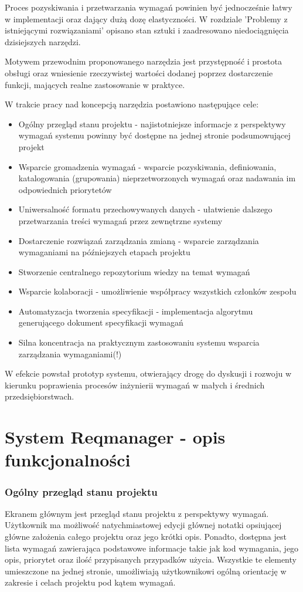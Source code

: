     Proces pozyskiwania i przetwarzania wymagań powinien być jednocześnie łatwy w implementacji oraz dający dużą dozę elastyczności. W rozdziale 'Problemy z istniejącymi rozwiązaniami' opisano stan sztuki i zaadresowano niedociągnięcia dzisiejszych narzędzi. 

    Motywem przewodnim proponowanego narzędzia jest przystępność i prostota obsługi oraz wniesienie rzeczywistej wartości dodanej poprzez dostarczenie funkcji, mających realne zastosowanie w praktyce. 

    W trakcie pracy nad koncepcją narzędzia postawiono następujące cele:
    
    \begin{itemize}
      \item Ogólny przegląd stanu projektu - najistotniejsze informacje z perspektywy wymagań systemu powinny być dostępne na jednej stronie podsumowującej projekt
      \item Wsparcie gromadzenia wymagań - wsparcie pozyskiwania, definiowania, katalogowania (grupowania) nieprzetworzonych wymagań oraz nadawania im odpowiednich priorytetów
      \item Uniwersalność formatu przechowywanych danych - ułatwienie dalszego przetwarzania treści wymagań przez zewnętrzne systemy
      \item Dostarczenie rozwiązań zarządzania zmianą - wsparcie zarządzania wymaganiami na późniejszych etapach projektu
      \item Stworzenie centralnego repozytorium wiedzy na temat wymagań
      \item Wsparcie kolaboracji - umożliwienie współpracy wszystkich członków zespołu
      \item Automatyzacja tworzenia specyfikacji - implementacja algorytmu generującego dokument specyfikacji wymagań 
      \item Silna koncentracja na praktycznym zastosowaniu systemu wsparcia zarządzania wymaganiami(!) 
    \end{itemize}

    W efekcie powstał prototyp systemu, otwierający drogę do dyskusji i rozwoju w kierunku poprawienia procesów inżynierii wymagań w małych i średnich przedsiębiorstwach. 

  \section{System Reqmanager - opis funkcjonalności}

    \subsubsection{Ogólny przegląd stanu projektu}
      Ekranem głównym jest przegląd stanu projektu z perspektywy wymagań. Użytkownik ma możliwość natychmiastowej edycji głównej notatki opsiującej główne założenia całego projektu oraz jego krótki opis. Ponadto, dostępna jest lista wymagań zawierająca podstawowe informacje takie jak kod wymagania, jego opis, priorytet oraz ilość przypisanych przypadków użycia. Wszystkie te elementy umieszczone na jednej stronie, umożliwiają użytkownikowi ogólną orientację w zakresie i celach projektu pod kątem wymagań. 

